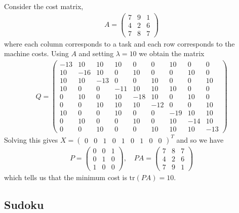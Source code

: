 \documentclass{article}
\begin{document}
Consider the cost matrix, \begin{align*}
    A = \begin{pmatrix}
        7 & 9 & 1\\
        4 & 2 & 6\\
        7 & 8 & 7
    \end{pmatrix}
\end{align*}
where each column corresponds to a task and each row corresponds to the machine costs. Using \(A\) and setting \(\lambda = 10\) we obtain the matrix
\begin{align*}
    Q = \begin{pmatrix}
        -13 & 10 & 10 & 10 & 0 & 0 & 10 & 0 & 0 \\
        10 & -16 & 10 & 0 & 10 & 0 & 0 & 10 & 0 \\
        10 & 10 & -13 & 0 & 0 & 10 & 0 & 0 & 10 \\
        10 & 0 & 0 & -11 & 10 & 10 & 10 & 0 & 0 \\
        0 & 10 & 0 & 10 & -18 & 10 & 0 & 10 & 0 \\
        0 & 0 & 10 & 10 & 10 & -12 & 0 & 0 & 10 \\
        10 & 0 & 0 & 10 & 0 & 0 & -19 & 10 & 10 \\
        0 & 10 & 0 & 0 & 10 & 0 & 10 & -14 & 10 \\
        0 & 0 & 10 & 0 & 0 & 10 & 10 & 10 & -13
    \end{pmatrix}
\end{align*}
Solving this gives \(X = \begin{pmatrix}
    0 & 0 & 1 & 0 & 1 & 0 & 1 & 0 & 0
\end{pmatrix}^T\)
and so we have \begin{align*}
    P = \begin{pmatrix}
        0 & 0 & 1 \\
        0 & 1 & 0 \\
        1 & 0 & 0
    \end{pmatrix}, \quad PA = \begin{pmatrix}
        7 & 8 & 7 \\
        4 & 2 & 6 \\
        7 & 9 & 1
    \end{pmatrix}
\end{align*}
which tells us that the minimum cost is \(\text{tr}(PA) = 10\).
\subsection{Sudoku}
\end{document}
